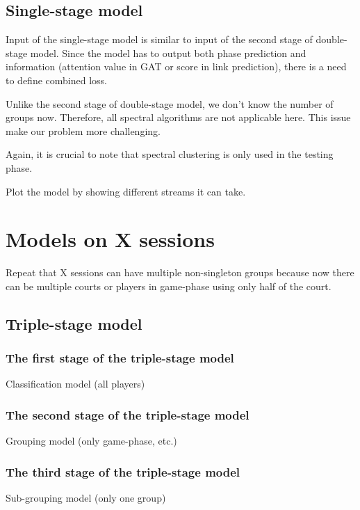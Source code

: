 \documentclass[doctype=mastersthesis,lang=english,BCOR=15mm,biblatex]{ldvbook}
\begin{document}
\subsection{Single-stage model}

Input of the single-stage model is similar to input of the second stage of double-stage model. Since the model has to output both phase prediction and information (attention value in GAT or score in link prediction), there is a need to define combined loss.

Unlike the second stage of double-stage model, we don't know the number of groups now. Therefore, all spectral algorithms are not applicable here. This issue make our problem more challenging.

Again, it is crucial to note that spectral clustering is only used in the testing phase.

Plot the model by showing different streams it can take.

\section{Models on X sessions}

Repeat that X sessions can have multiple non-singleton groups because now there can be multiple courts or players in game-phase using only half of the court.

\subsection{Triple-stage model}

\subsubsection{The first stage of the triple-stage model}

Classification model (all players)

\subsubsection{The second stage of the triple-stage model}

Grouping model (only game-phase, etc.)

\subsubsection{The third stage of the triple-stage model}

Sub-grouping model (only one group)
\end{document}
